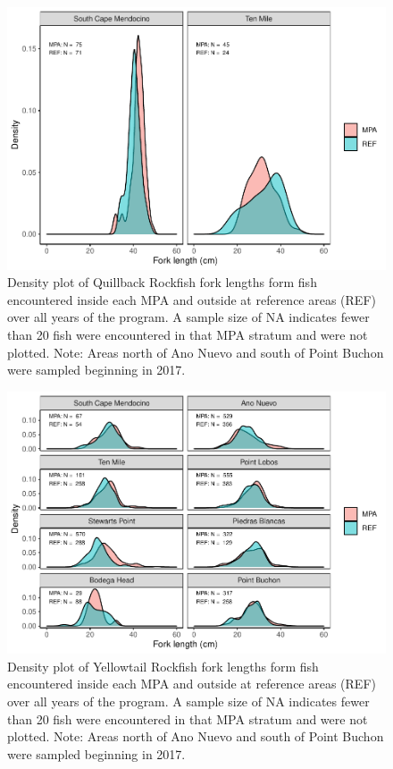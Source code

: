 \documentclass[
]{article}
\begin{document}
\begin{figure}
\centering
\includegraphics{CCRFP_available_data_for_assessments_files/figure-latex/lengths-3.pdf}
\caption{\label{fig:lengths-3}Density plot of Quillback Rockfish fork lengths form fish encountered inside each MPA and outside at reference areas (REF) over all years of the program. A sample size of NA indicates fewer than 20 fish were encountered in that MPA stratum and were not plotted. Note: Areas north of Ano Nuevo and south of Point Buchon were sampled beginning in 2017.}
\end{figure}

\begin{figure}
\centering
\includegraphics{CCRFP_available_data_for_assessments_files/figure-latex/lengths-4.pdf}
\caption{\label{fig:lengths-4}Density plot of Yellowtail Rockfish fork lengths form fish encountered inside each MPA and outside at reference areas (REF) over all years of the program. A sample size of NA indicates fewer than 20 fish were encountered in that MPA stratum and were not plotted. Note: Areas north of Ano Nuevo and south of Point Buchon were sampled beginning in 2017.}
\end{figure}

\FloatBarrier
\end{document}
